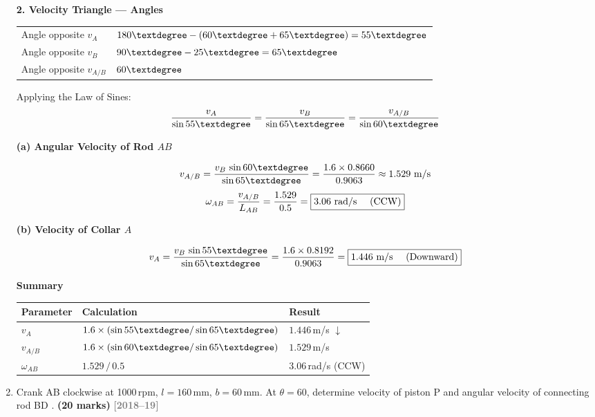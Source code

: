 \documentclass[12pt,a3paper]{article}
\newcommand{\yr}[1]{\hfill\textcolor{gray}{\small\textbf{[#1]}}}
\newcommand{\mk}[1]{\textcolor{orange!70!black}{\small\textbf{(#1 marks)}}}
\begin{document}
\begin{enumerate}
\begin{tcolorbox}[enhanced,breakable,ansbox,colback=cH!4,colframe=cH,
  boxrule=0.8pt,arc=5pt,
  title={\textbf{Solution}},fonttitle=\bfseries\color{white},
  colbacktitle=cH]
\medskip
\textbf{2. Velocity Triangle — Angles}

\begin{center}
\begin{tabular}{ll}
\toprule
Angle opposite $v_A$ & $180\textdegree - (60\textdegree + 65\textdegree) = 55\textdegree$ \\[3pt]
Angle opposite $v_B$ & $90\textdegree - 25\textdegree = 65\textdegree$ \\[3pt]
Angle opposite $v_{A/B}$ & $60\textdegree$ \\
\bottomrule
\end{tabular}
\end{center}

Applying the Law of Sines:
\[
  \frac{v_A}{\sin 55\textdegree}
  = \frac{v_B}{\sin 65\textdegree}
  = \frac{v_{A/B}}{\sin 60\textdegree}
\]

\medskip
\textbf{(a) Angular Velocity of Rod $AB$}

\[
  v_{A/B} = \frac{v_B\,\sin 60\textdegree}{\sin 65\textdegree}
           = \frac{1.6\times 0.8660}{0.9063}
           \approx 1.529\text{ m/s}
\]
\[
  \omega_{AB} = \frac{v_{A/B}}{L_{AB}} = \frac{1.529}{0.5}
  = \boxed{3.06\text{ rad/s \quad(CCW)}}
\]

\medskip
\textbf{(b) Velocity of Collar $A$}

\[
  v_A = \frac{v_B\,\sin 55\textdegree}{\sin 65\textdegree}
      = \frac{1.6\times 0.8192}{0.9063}
  = \boxed{1.446\text{ m/s \quad(Downward)}}
\]

\medskip
\textbf{Summary}

\begin{center}
\begin{tabular}{lll}
\toprule
\textbf{Parameter} & \textbf{Calculation} & \textbf{Result}\\
\midrule
$v_A$         & $1.6\times(\sin55\textdegree/\sin65\textdegree)$ & $1.446$\,m/s $\downarrow$\\[3pt]
$v_{A/B}$     & $1.6\times(\sin60\textdegree/\sin65\textdegree)$ & $1.529$\,m/s\\[3pt]
$\omega_{AB}$ & $1.529\,/\,0.5$                                  & $3.06$\,rad/s (CCW)\\
\bottomrule
\end{tabular}
\end{center}

\end{tcolorbox}


\item \label{qlabel:B5-Q6}
Crank AB clockwise at 1000\,rpm, $l = 160$\,mm, $b = 60$\,mm. At $\theta = 60$\textdegree, determine velocity of piston P and angular velocity of connecting rod BD .
\mk{20}
\yr{2018--19}


\end{enumerate}
\end{document}
